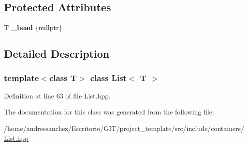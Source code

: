 \subsection*{Protected Attributes}
\begin{DoxyCompactItemize}
\item 
\mbox{\label{classList_a049bde788f66e78f5ddc762e541f23df}} 
T {\bfseries \+\_\+head} \{nullptr\}
\end{DoxyCompactItemize}


\subsection{Detailed Description}
\subsubsection*{template$<$class T$>$\newline
class List$<$ T $>$}



Definition at line 63 of file List.\+hpp.



The documentation for this class was generated from the following file\+:\begin{DoxyCompactItemize}
\item 
/home/andressanchez/\+Escritorio/\+G\+I\+T/project\+\_\+template/src/include/containers/\hyperlink{List_8hpp}{List.\+hpp}\end{DoxyCompactItemize}
